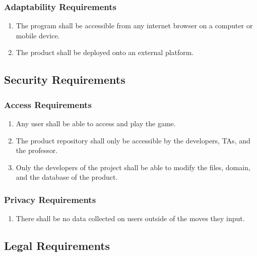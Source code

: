 \documentclass[]{article}
\begin{document}

\subsubsection{Adaptability Requirements}
\label{ssub:adaptability_requirements}
\begin{enumerate}[{MS}1., leftmargin=2\parindent, resume]
	\item The program shall be accessible from any internet browser on a computer or mobile device.
	\item The product shall be deployed onto an external platform.
\end{enumerate}


\subsection{Security Requirements}
\label{sub:security_requirements}

\subsubsection{Access Requirements}
\label{ssub:access_requirements}
\begin{enumerate}[{SR}1., leftmargin=2\parindent]
	\item Any user shall be able to access and play the game.
	\item The product repository shall only be accessible by the developers, TAs, and the professor.
	\item Only the developers of the project shall be able to modify the files, domain, and the database of the product.
\end{enumerate}

\subsubsection{Privacy Requirements}
\label{ssub:privacy_requirements}
\begin{enumerate}[{SR}1., leftmargin=2\parindent, resume]
	\item There shall be no data collected on users outside of the moves they input.
\end{enumerate}

\subsection{Legal Requirements}
\label{sub:legal_requirements}
\end{document}
